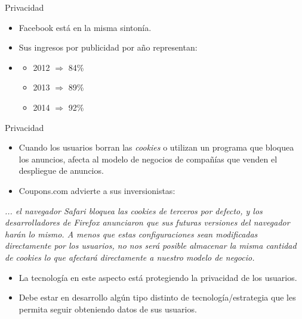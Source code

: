 \documentclass[11pt,aspectratio=169]{beamer}
\begin{document}
    \begin{frame}{Privacidad}
    \begin{itemize}
        \item Facebook está en la misma sintonía. \pause
        \item Sus ingresos por publicidad por año representan:\item 
            \begin{itemize}
                \item 2012 $\Rightarrow$ 84\% \pause
                \item 2013 $\Rightarrow$ 89\% \pause
                \item 2014 $\Rightarrow$ 92\%
            \end{itemize}
    \end{itemize} 
    \end{frame}
    
    \begin{frame}{Privacidad}
    \begin{itemize}
        \item Cuando los usuarios borran las \textit{cookies} o utilizan un programa que bloquea los anuncios, afecta al modelo de negocios de compañías que 
        venden el despliegue de anuncios. \pause
        \item Coupons.com advierte a sus inversionistas:\pause
    \end{itemize}
    \begin{block}{}
        \textit{... el navegador Safari bloquea las cookies de terceros por defecto, y los desarrolladores de Firefox anunciaron que sus futuras versiones 
        del navegador harán lo mismo. A menos que estas configuraciones sean modificadas directamente por los usuarios, no nos será posible almacenar 
        la misma cantidad de cookies lo que afectará directamente a nuestro modelo de negocio.}
    \end{block}\pause
    \begin{itemize}
        \item La tecnología en este aspecto está protegiendo la privacidad de los usuarios.\pause
        \item Debe estar en desarrollo algún tipo distinto de tecnología/estrategia que les permita seguir obteniendo datos de sus usuarios.
    \end{itemize}	
    \end{frame}
\end{document}
